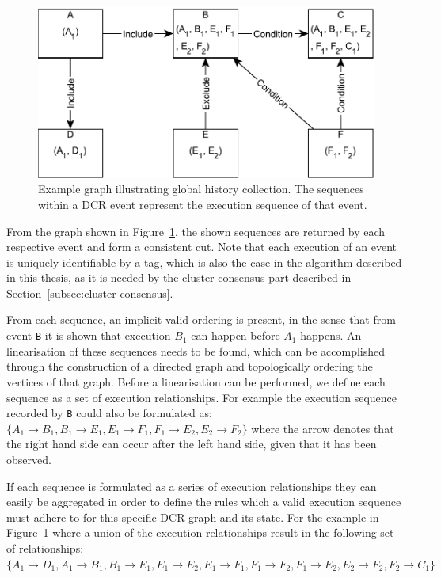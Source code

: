 \documentclass{article}
\begin{document}
	\begin{figure}[ht]
		\center
		\includegraphics[scale=0.6]{figures/dcr-graphs/global-history-collection-example.pdf}
		\caption{Example graph illustrating global history collection. The sequences within a DCR event represent the execution sequence of that event.}
		\label{fig:global-history-collection-example}
	\end{figure}
	\FloatBarrier

	From the graph shown in Figure~\ref{fig:global-history-collection-example}, the shown sequences are returned by each respective event and form a consistent cut.
	Note that each execution of an event is uniquely identifiable by a tag, which is also the case in the algorithm described in this thesis, as it is needed by the cluster consensus part described in Section~\ref{subsec:cluster-consensus}.

	From each sequence, an implicit valid ordering is present, in the sense that from event \texttt{B} it is shown that execution $B_1$ can happen before $A_1$ happens.
	An linearisation of these sequences needs to be found, which can be accomplished through the construction of a directed graph and topologically ordering the vertices of that graph.
	Before a linearisation can be performed, we define each sequence as a set of execution relationships.
	For example the execution sequence recorded by \texttt{B} could also be formulated as: $\{A_1 \rightarrow B_1, B_1 \rightarrow E_1, E_1 \rightarrow F_1, F_1 \rightarrow E_2, E_2 \rightarrow F_2\}$ where the arrow denotes that the right hand side can occur after the left hand side, given that it has been observed.

	If each sequence is formulated as a series of execution relationships they can easily be aggregated in order to define the rules which a valid execution sequence must adhere to for this specific DCR graph and its state.
	For the example in Figure~\ref{fig:global-history-collection-example} where a union of the execution relationships result in the following set of relationships: $\{A_1 \rightarrow D_1, A_1 \rightarrow B_1, B_1 \rightarrow E_1, E_1 \rightarrow E_2, E_1 \rightarrow F_1, F_1 \rightarrow F_2, F_1 \rightarrow E_2, E_2 \rightarrow F_2, F_2 \rightarrow C_1\}$
\end{document}
